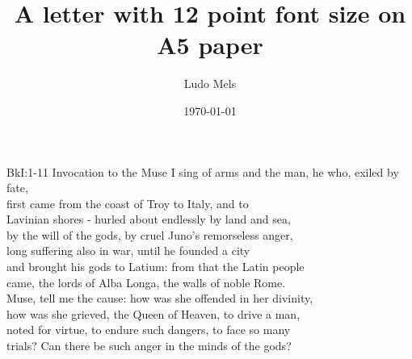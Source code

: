 \documentclass[12pt, a5paper]{letter}
\title{A letter with 12 point font size on A5 paper}
\author{Ludo Mels}
\date{\today}
\begin{document}

{BkI:1-11 Invocation to the Muse}
I sing of arms and the man, he who, exiled by fate,\\
first came from the coast of Troy to Italy, and to\\
Lavinian shores - hurled about endlessly by land and sea,\\
by the will of the gods, by cruel Juno's remorseless anger,\\
long suffering also in war, until he founded a city\\
and brought his gods to Latium: from that the Latin people\\
came, the lords of Alba Longa, the walls of noble Rome.\\
Muse, tell me the cause: how was she offended in her divinity,\\
how was she grieved, the Queen of Heaven, to drive a man,\\
noted for virtue, to endure such dangers, to face so many\\
trials? Can there be such anger in the minds of the gods?
\end{document}
